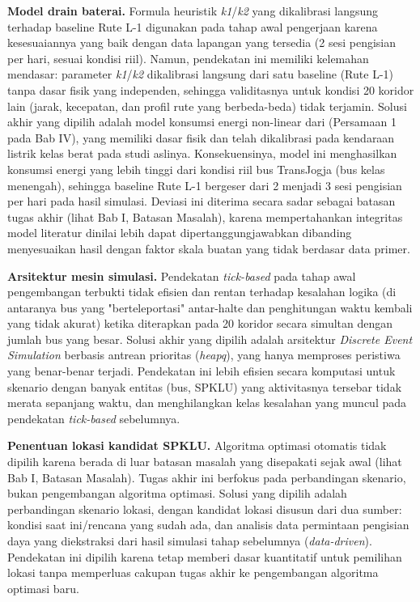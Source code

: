 \textbf{Model drain baterai.} Formula heuristik \textit{k1}/\textit{k2} yang
dikalibrasi langsung terhadap baseline Rute L-1 digunakan pada tahap awal
pengerjaan karena kesesuaiannya yang baik dengan data lapangan yang tersedia
(2 sesi pengisian per hari, sesuai kondisi riil). Namun, pendekatan ini
memiliki kelemahan mendasar: parameter \textit{k1}/\textit{k2} dikalibrasi
langsung dari satu baseline (Rute L-1) tanpa dasar fisik yang independen,
sehingga validitasnya untuk kondisi 20 koridor lain (jarak, kecepatan, dan
profil rute yang berbeda-beda) tidak terjamin. Solusi akhir yang dipilih
adalah model konsumsi energi non-linear dari \textcite{mamarikas2025}
(Persamaan 1 pada Bab IV), yang memiliki dasar fisik dan telah dikalibrasi
pada kendaraan listrik kelas berat pada studi aslinya. Konsekuensinya, model
ini menghasilkan konsumsi energi yang lebih tinggi dari kondisi riil bus
TransJogja (bus kelas menengah), sehingga baseline Rute L-1 bergeser dari
2 menjadi 3 sesi pengisian per hari pada hasil simulasi. Deviasi ini
diterima secara sadar sebagai batasan tugas akhir (lihat Bab I, Batasan
Masalah), karena mempertahankan integritas model literatur dinilai lebih
dapat dipertanggungjawabkan dibanding menyesuaikan hasil dengan faktor
skala buatan yang tidak berdasar data primer.

\textbf{Arsitektur mesin simulasi.} Pendekatan \textit{tick-based} pada
tahap awal pengembangan terbukti tidak efisien dan rentan terhadap
kesalahan logika (di antaranya bus yang "berteleportasi" antar-halte dan
penghitungan waktu kembali yang tidak akurat) ketika diterapkan pada 20
koridor secara simultan dengan jumlah bus yang besar. Solusi akhir yang
dipilih adalah arsitektur \textit{Discrete Event Simulation} berbasis
antrean prioritas (\textit{heapq}), yang hanya memproses peristiwa yang
benar-benar terjadi. Pendekatan ini lebih efisien secara komputasi untuk
skenario dengan banyak entitas (bus, SPKLU) yang aktivitasnya tersebar
tidak merata sepanjang waktu, dan menghilangkan kelas kesalahan yang
muncul pada pendekatan \textit{tick-based} sebelumnya.

\textbf{Penentuan lokasi kandidat SPKLU.} Algoritma optimasi otomatis
tidak dipilih karena berada di luar batasan masalah yang disepakati sejak
awal (lihat Bab I, Batasan Masalah). Tugas akhir ini berfokus pada
perbandingan skenario, bukan pengembangan algoritma optimasi. Solusi yang
dipilih adalah perbandingan skenario lokasi, dengan kandidat lokasi disusun
dari dua sumber: kondisi saat ini/rencana yang sudah ada, dan analisis data
permintaan pengisian daya yang diekstraksi dari hasil simulasi tahap
sebelumnya (\textit{data-driven}). Pendekatan ini dipilih karena tetap
memberi dasar kuantitatif untuk pemilihan lokasi tanpa memperluas cakupan
tugas akhir ke pengembangan algoritma optimasi baru.

